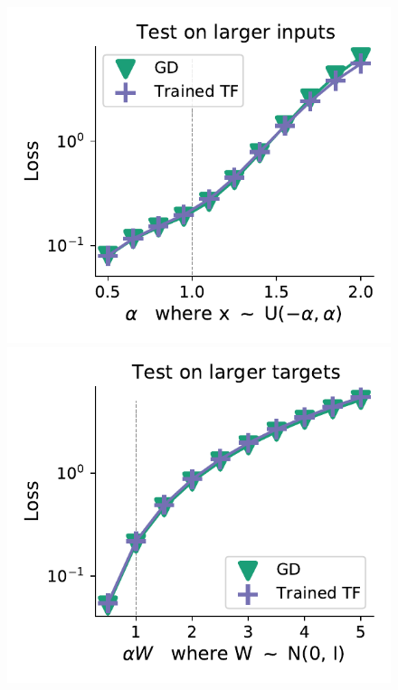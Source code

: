 \documentclass{article}
\theoremstyle{plain}
\theoremstyle{definition}
\theoremstyle{remark}
\begin{document}
\begin{figure}
\begin{center}
\begin{minipage}{.28\textwidth}
\begin{center}
  \end{center}
  \vspace{-10pt}
\end{minipage}
\begin{minipage}{.23\textwidth}
  \centering
  \begin{center}
    \includegraphics[width=1.\textwidth]{Final_figures/softmax/normal_17.pdf}
  \end{center}
  \vspace{-10pt}
\end{minipage}
\begin{minipage}{.23\textwidth}
  \centering
  \begin{center}
    \includegraphics[width=1.\textwidth]{Final_figures/softmax/normal_18.pdf}

\end{center}
\end{minipage}
\end{center}
\end{figure}
\end{document}
